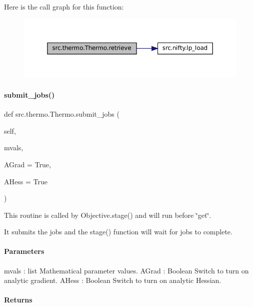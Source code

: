 Here is the call graph for this function\+:
\nopagebreak
\begin{figure}[H]
\begin{center}
\leavevmode
\includegraphics[width=350pt]{classsrc_1_1thermo_1_1Thermo_a9d63adfe6c3808c186a47d194de9d851_cgraph}
\end{center}
\end{figure}
\mbox{\label{classsrc_1_1thermo_1_1Thermo_a9f614671342b1e8cdd55ce4c8b153242}} 
\paragraph{\texorpdfstring{submit\+\_\+jobs()}{submit\_jobs()}}
{\footnotesize\ttfamily def src.\+thermo.\+Thermo.\+submit\+\_\+jobs (\begin{DoxyParamCaption}\item[{}]{self,  }\item[{}]{mvals,  }\item[{}]{A\+Grad = {\ttfamily True},  }\item[{}]{A\+Hess = {\ttfamily True} }\end{DoxyParamCaption})}



This routine is called by Objective.\+stage() and will run before \char`\"{}get\char`\"{}. 

It submits the jobs and the stage() function will wait for jobs to complete.

\paragraph*{Parameters }

mvals \+: list Mathematical parameter values. A\+Grad \+: Boolean Switch to turn on analytic gradient. A\+Hess \+: Boolean Switch to turn on analytic Hessian.

\paragraph*{Returns }

